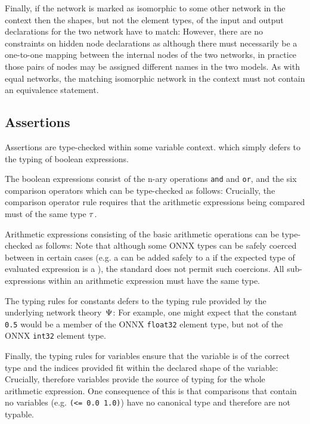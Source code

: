 Finally, if the network is marked as isomorphic to some other network in the context then the shapes, but not the element types, of the input and output declarations for the two network have to match:
\unskip
However, there are no constraints on hidden node declarations as although there must necessarily be a one-to-one mapping between the internal nodes of the two networks, in practice those pairs of nodes may be assigned different names in the two models.
As with equal networks, the matching isomorphic network in the context must not contain an equivalence statement.

\subsection{Assertions}

Assertions are type-checked within some variable context.
\unskip
which simply defers to the typing of boolean expressions.

The boolean expressions consist of the n-ary operations \texttt{and} and \texttt{or}, and the six comparison operators which can be type-checked as follows:
\unskip
Crucially, the comparison operator rule requires that the arithmetic expressions being compared must of the same type $\tau$.

Arithmetic expressions consisting of the basic arithmetic operations can be type-checked as follows:
\unskip
Note that although some ONNX types can be safely coerced between in certain cases (e.g. a  can be added safely to a  if the expected type of evaluated expression is a ), the standard does not permit such coercions.
All sub-expressions within an arithmetic expression must have the same type. 

The typing rules for constants defers to the typing rule provided by the underlying network theory~$\Psi$:
\unskip
For example, one might expect that the constant \texttt{0.5} would be a member of the ONNX \texttt{float32} element type, but not of the ONNX \texttt{int32} element type.

Finally, the typing rules for variables ensure that the variable is of the correct type and the indices provided fit within the declared shape of the variable:
\unskip
Crucially, therefore variables provide the source of typing for the whole arithmetic expression. 
One consequence of this is that comparisons that contain no variables (e.g. \texttt{(<= 0.0 1.0)}) have no canonical type and therefore are not typable.


